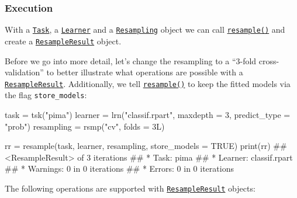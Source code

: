\documentclass[]{article}
\newenvironment{Shaded}{}{}
\newcommand{\DataTypeTok}[1]{#1}
\newcommand{\DecValTok}[1]{#1}
\newcommand{\KeywordTok}[1]{\textcolor[rgb]{0.00,0.00,1.00}{#1}}
\newcommand{\NormalTok}[1]{#1}
\newcommand{\OtherTok}[1]{\textcolor[rgb]{1.00,0.25,0.00}{#1}}
\newcommand{\StringTok}[1]{\textcolor[rgb]{0.00,0.50,0.50}{#1}}
\renewenvironment{Shaded} {\begin{snugshade}\small} {\end{snugshade}}
\begin{document}
\hypertarget{resampling-exec}{%
\subsubsection{Execution}\label{resampling-exec}}

With a \href{https://mlr3.mlr-org.com/reference/Task.html}{\texttt{Task}}, a \href{https://mlr3.mlr-org.com/reference/Learner.html}{\texttt{Learner}} and a \href{https://mlr3.mlr-org.com/reference/Resampling.html}{\texttt{Resampling}} object we can call \href{https://mlr3.mlr-org.com/reference/resample.html}{\texttt{resample()}} and create a \href{https://mlr3.mlr-org.com/reference/ResampleResult.html}{\texttt{ResampleResult}} object.

Before we go into more detail, let's change the resampling to a ``3-fold cross-validation'' to better illustrate what operations are possible with a \href{https://mlr3.mlr-org.com/reference/ResampleResult.html}{\texttt{ResampleResult}}.
Additionally, we tell \href{https://mlr3.mlr-org.com/reference/resample.html}{\texttt{resample()}} to keep the fitted models via the flag \texttt{store\_models}:

\begin{Shaded}
\begin{Highlighting}[]
\NormalTok{task =}\StringTok{ }\KeywordTok{tsk}\NormalTok{(}\StringTok{"pima"}\NormalTok{)}
\NormalTok{learner =}\StringTok{ }\KeywordTok{lrn}\NormalTok{(}\StringTok{"classif.rpart"}\NormalTok{, }\DataTypeTok{maxdepth =} \DecValTok{3}\NormalTok{, }\DataTypeTok{predict_type =} \StringTok{"prob"}\NormalTok{)}
\NormalTok{resampling =}\StringTok{ }\KeywordTok{rsmp}\NormalTok{(}\StringTok{"cv"}\NormalTok{, }\DataTypeTok{folds =}\NormalTok{ 3L)}

\NormalTok{rr =}\StringTok{ }\KeywordTok{resample}\NormalTok{(task, learner, resampling, }\DataTypeTok{store_models =} \OtherTok{TRUE}\NormalTok{)}
\KeywordTok{print}\NormalTok{(rr)}
\NormalTok{## <ResampleResult> of 3 iterations}
\NormalTok{## * Task: pima}
\NormalTok{## * Learner: classif.rpart}
\NormalTok{## * Warnings: 0 in 0 iterations}
\NormalTok{## * Errors: 0 in 0 iterations}
\end{Highlighting}
\end{Shaded}

The following operations are supported with \href{https://mlr3.mlr-org.com/reference/ResampleResult.html}{\texttt{ResampleResult}} objects:
\end{document}
